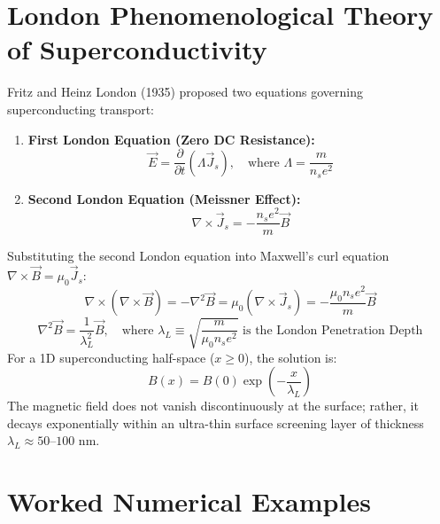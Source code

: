 \section{London Phenomenological Theory of Superconductivity}
Fritz and Heinz London (1935) proposed two equations governing superconducting transport:
\begin{enumerate}[leftmargin=*,itemsep=3pt]
    \item \textbf{First London Equation (Zero DC Resistance):}
    \begin{equation}
    \vec{E} = \frac{\partial}{\partial t}(\Lambda \vec{J}_s), \quad \text{where } \Lambda = \frac{m}{n_s e^2}
    \end{equation}
    \item \textbf{Second London Equation (Meissner Effect):}
    \begin{equation}
    \nabla \times \vec{J}_s = -\frac{n_s e^2}{m}\vec{B}
    \end{equation}
\end{enumerate}
Substituting the second London equation into Maxwell's curl equation $\nabla \times \vec{B} = \mu_0 \vec{J}_s$:
\begin{equation}
\nabla \times (\nabla \times \vec{B}) = -\nabla^2 \vec{B} = \mu_0 (\nabla \times \vec{J}_s) = -\frac{\mu_0 n_s e^2}{m}\vec{B}
\end{equation}
\begin{equation}
\nabla^2 \vec{B} = \frac{1}{\lambda_L^2}\vec{B}, \quad \text{where } \lambda_L \equiv \sqrt{\frac{m}{\mu_0 n_s e^2}} \text{ is the London Penetration Depth}
\end{equation}
For a 1D superconducting half-space ($x \ge 0$), the solution is:
\begin{equation}
B(x) = B(0) \exp\left(-\frac{x}{\lambda_L}\right)
\end{equation}
The magnetic field does not vanish discontinuously at the surface; rather, it decays exponentially within an ultra-thin surface screening layer of thickness $\lambda_L \approx 50\text{--}100\text{ nm}$.

\section{Worked Numerical Examples}

